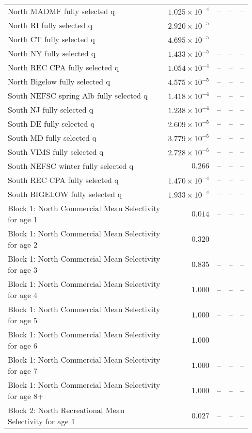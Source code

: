 \documentclass[
]{article}
\begin{document}
\begin{landscape}
\begin{longtable}[t]{lrrrr}
North MADMF fully selected q & $1.025\times 10^{-4}$ & -- & -- & --\\
North RI fully selected q & $2.920\times 10^{-5}$ & -- & -- & --\\
North CT fully selected q & $4.695\times 10^{-5}$ & -- & -- & --\\
\addlinespace
North NY fully selected q & $1.433\times 10^{-5}$ & -- & -- & --\\
North REC CPA fully selected q & $1.054\times 10^{-4}$ & -- & -- & --\\
North Bigelow fully selected q & $4.575\times 10^{-5}$ & -- & -- & --\\
South NEFSC spring Alb fully selected q & $1.418\times 10^{-4}$ & -- & -- & --\\
South NJ fully selected q & $1.238\times 10^{-4}$ & -- & -- & --\\
\addlinespace
South DE fully selected q & $2.609\times 10^{-5}$ & -- & -- & --\\
South MD fully selected q & $3.779\times 10^{-5}$ & -- & -- & --\\
South VIMS fully selected q & $2.728\times 10^{-5}$ & -- & -- & --\\
South NEFSC winter fully selected q & $0.266$ & -- & -- & --\\
South REC CPA fully selected q & $1.470\times 10^{-4}$ & -- & -- & --\\
\addlinespace
South BIGELOW fully selected q & $1.933\times 10^{-4}$ & -- & -- & --\\
Block 1: North Commercial Mean Selectivity for age 1 & $0.014$ & -- & -- & --\\
Block 1: North Commercial Mean Selectivity for age 2 & $0.320$ & -- & -- & --\\
Block 1: North Commercial Mean Selectivity for age 3 & $0.835$ & -- & -- & --\\
Block 1: North Commercial Mean Selectivity for age 4 & $1.000$ & -- & -- & --\\
\addlinespace
Block 1: North Commercial Mean Selectivity for age 5 & $1.000$ & -- & -- & --\\
Block 1: North Commercial Mean Selectivity for age 6 & $1.000$ & -- & -- & --\\
Block 1: North Commercial Mean Selectivity for age 7 & $1.000$ & -- & -- & --\\
Block 1: North Commercial Mean Selectivity for age 8+ & $1.000$ & -- & -- & --\\
Block 2: North Recreational Mean Selectivity for age 1 & $0.027$ & -- & -- & --\\

\end{longtable}
\end{landscape}
\end{document}
